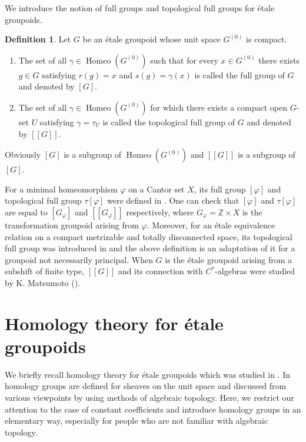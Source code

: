 \documentclass[11pt]{article}
\theoremstyle{definition}
\newtheorem{df}[thm]{Definition}
\renewcommand{\phi}{\varphi}
\newcommand{\Homeo}{\operatorname{Homeo}}
\newcommand{\Z}{\mathbb{Z}}
\begin{document}
We introduce the notion of full groups and topological full groups 
for \'etale groupoids. 

\begin{df}\label{tfg}
Let $G$ be an \'etale groupoid whose unit space $G^{(0)}$ is compact. 
\begin{enumerate}
\item The set of all $\gamma\in\Homeo(G^{(0)})$ such that 
for every $x\in G^{(0)}$ there exists $g\in G$ 
satisfying $r(g)=x$ and $s(g)=\gamma(x)$ 
is called the full group of $G$ and denoted by $[G]$. 
\item The set of all $\gamma\in\Homeo(G^{(0)})$ for which 
there exists a compact open $G$-set $U$ satisfying $\gamma=\tau_U$ 
is called the topological full group of $G$ and denoted by $[[G]]$. 
\end{enumerate}
Obviously $[G]$ is a subgroup of $\Homeo(G^{(0)})$ and 
$[[G]]$ is a subgroup of $[G]$. 
\end{df}

For a minimal homeomorphism $\phi$ on a Cantor set $X$, 
its full group $[\phi]$ and topological full group $\tau[\phi]$ were 
defined in \cite{GPS2}. 
One can check that 
$[\phi]$ and $\tau[\phi]$ are equal to $[G_\phi]$ and $[[G_\phi]]$ 
respectively, 
where $G_\phi=\Z\times X$ is the transformation groupoid arising from $\phi$. 
Moreover, for an \'etale equivalence relation 
on a compact metrizable and totally disconnected space, 
its topological full group was introduced in \cite{Msrtfg} and 
the above definition is an adaptation of it 
for a groupoid not necessarily principal. 
When $G$ is the \'etale groupoid 
arising from a subshift of finite type, 
$[[G]]$ and its connection with $C^*$-algebras were studied 
by K. Matsumoto (\cite{Matsu}). 




\section{Homology theory for \'etale groupoids}

We briefly recall homology theory for \'etale groupoids 
which was studied in \cite{CM}. 
In \cite{CM} homology groups are defined for sheaves on the unit space and 
discussed from various viewpoints by using methods of algebraic topology. 
Here, we restrict our attention to the case of constant coefficients and 
introduce homology groups in an elementary way, 
especially for people who are not familiar with algebraic topology. 
\end{document}
